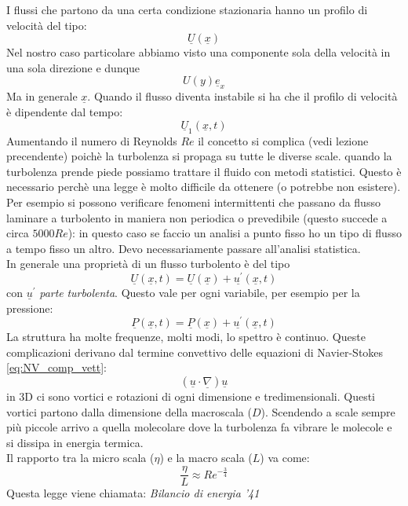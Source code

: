 I flussi che partono da una certa condizione stazionaria hanno un profilo di velocità del tipo:
\[
\underline{U}\left( \underline{x}\right)
\]
Nel  nostro caso particolare abbiamo visto una componente sola della velocità in una sola direzione e dunque 
\[
  U\left( y\right)  \underline{e}_x
\]
Ma in generale $ \underline{x} $. Quando il flusso diventa instabile si ha che il profilo di velocità è dipendente dal tempo:
\[
  \underline{U}_1\left( \underline{x},t\right) 
\]
Aumentando il numero di Reynolds $ Re $ il concetto si complica (vedi lezione precendente) poichè la turbolenza si propaga su tutte le diverse scale.
quando la turbolenza prende piede possiamo trattare il fluido con metodi statistici.
Questo è necessario perchè una legge è molto difficile da ottenere (o potrebbe non esistere).
Per esempio si possono verificare fenomeni intermittenti che passano da flusso laminare a turbolento in maniera non periodica o prevedibile (questo succede a circa $ 5000 Re$): in questo caso se faccio un analisi a punto fisso ho un tipo di flusso a tempo fisso un altro.
Devo necessariamente passare all'analisi statistica.\\
In generale una proprietà di un flusso turbolento è del tipo 
\[
  \underline{U}\left( \underline{x},t\right) =\underline{U}\left( \underline{x}\right) +\underline{u^{\prime}}\left( \underline{x},t\right) 
\]
con $ \underline{u}^{\prime} $ \textit{parte} \textit{turbolenta}. Questo vale per ogni variabile, per esempio per la pressione:
\[
  \underline{P}\left( \underline{x},t\right) =\underline{P}\left( \underline{x}\right) +\underline{u^{\prime}}\left( \underline{x},t\right) 
\]
La struttura ha molte frequenze, molti modi, lo spettro è continuo.
Queste complicazioni derivano dal termine convettivo delle equazioni di Navier-Stokes \cref{eq:NV_comp_vett}:
\[
  \left( \underline{u}\cdot \underline{\nabla}\right) \underline{u}
\]
in 3D ci sono vortici e rotazioni di ogni dimensione e tredimensionali. Questi vortici partono dalla dimensione della macroscala ($ D $).
Scendendo a scale sempre più piccole arrivo a quella molecolare dove la turbolenza fa vibrare le molecole e si dissipa in energia termica.\\
Il rapporto tra la micro scala ($ \eta $) e la macro scala ($ L $) va come:
\begin{equation}
	\frac{\eta}{L}\approx Re^{-\frac{3}{4}}
\end{equation}
Questa legge viene chiamata: \emph{Bilancio di energia '41}\\

